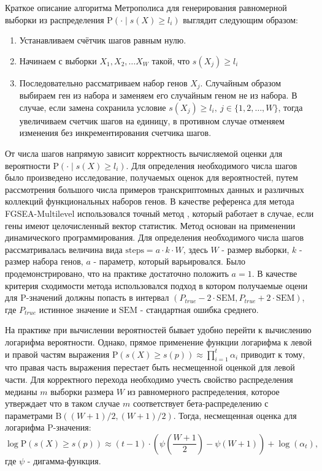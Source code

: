 Краткое описание алгоритма Метрополиса для генерирования равномерной выборки из распределения $\mathrm{P}\left(\cdot \mid s(X) \geqslant l_i \right)$ выглядит следующим образом:
\begin{enumerate}
    \item Устанавливаем счётчик шагов равным нулю.
    \item Начинаем с выборки $X_1, X_2, \ldots X_W$ такой, что $s(X_j) \geqslant l_i$
    \item Последовательно рассматриваем набор генов $X_j$. Случайным образом выбираем ген из набора и заменяем его случайным геном не из набора. В случае, если замена сохранила условие $s(X_j) \geqslant l_i, \ j \in \{1, 2, \ldots, W \}$, тогда увеличиваем счетчик шагов на единицу, в противном случае отменяем изменения без инкрементирования счетчика шагов.
\end{enumerate}
От числа шагов напрямую зависит корректность вычисляемой оценки для вероятности $\mathrm{P}\left(\cdot \mid s(X) \geqslant l_i \right)$. 
Для определения необходимого числа шагов было произведено исследование, получаемых оценок для вероятностей, путем рассмотрения большого числа примеров транскриптомных данных и различных коллекций функциональных наборов генов.  
В качестве референса для метода FGSEA-Multilevel использовался точный метод \cite{KorotkevichVKR}, который работает в случае, если гены имеют целочисленный вектор статистик. 
Метод основан на применении динамического программирования.
Для определения необходимого числа шагов рассматривалась величина вида $\text{steps} = a \cdot k \cdot W$, здесь $W$ - размер выборки, $k$ - размер набора генов, $a$ - параметр, который варьировался.
Было продемонстрировано, что на практике достаточно положить $a = 1$. В качестве критерия сходимости метода использовался подход в котором получаемые оцени для P-значений должны попасть в интервал $\left(P_{true} - 2 \cdot \mathrm{SEM}, P_{true} + 2 \cdot \mathrm{SEM} \right)$, где $P_{true}$ истинное значение и $\mathrm{SEM}$ - стандартная ошибка среднего.

На практике при вычислении вероятностей бывает удобно перейти к вычислению логарифма вероятности.
Однако, прямое применение функции логарифма к левой и правой частям выражения $\mathrm{P} \left(s(X) \geqslant s(p) \right) \approx \prod\limits_{i = 1}^{t} \alpha_i $ приводит к тому, что правая часть выражения перестает быть несмещенной оценкой для левой части.
Для корректного перехода необходимо учесть свойство распределения медианы $m$ выборки размера $W$ из равномерного распределения, которое утверждает что в таком случае $m$ соответствует бета-распределению с параметрами $\mathrm{B} \left((W + 1) / 2, (W + 1)/ 2 \right)$. Тогда, несмещенная оценка для логарифма P-значения:
\[
    \log \mathrm{P} \left(s(X) \geqslant s(p) \right) \approx (t - 1) \cdot \left( \psi \left( \frac{W + 1}{2}\right) - \psi \left(W + 1 \right)\right) + \log (\alpha_t),
\]
где $\psi$ - дигамма-функция.

